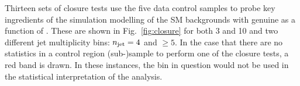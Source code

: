 Thirteen sets of closure tests use the five data control samples to
probe key ingredients of the simulation modelling of the SM
backgrounds with genuine \met as a function of \scalht. These are
shown in Fig.~\ref{fig:closure} for both 3 \ifb and 10 \ifb and two
different jet multiplicity bins: $n_{\text{jet}} = 4$ and $\geq 5$. In the case
that there are no statistics in a control region (sub-)sample to 
perform one of the closure tests, a red band is drawn. In these
instances, the bin in question would not be used in the statistical
interpretation of the analysis.

